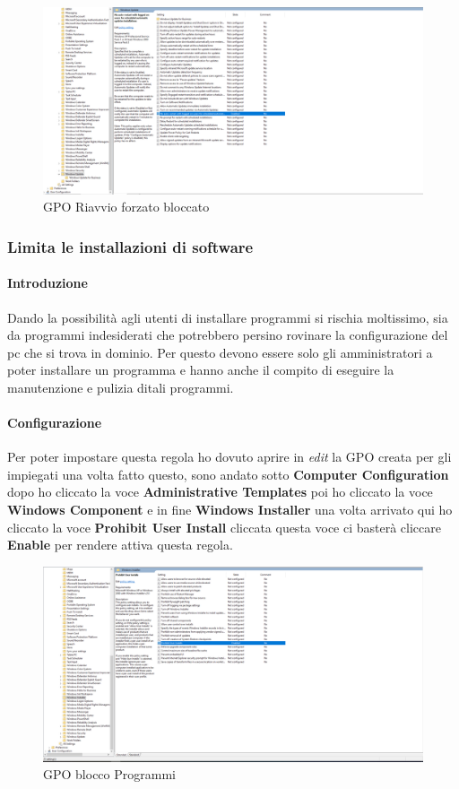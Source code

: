 \documentclass[../main.tex]{subfiles}
\begin{document}
\begin{figure}[h]
    \centering
    \includegraphics[width=1\textwidth]{Images/bloccoRiavvio.png}
    \caption{GPO Riavvio forzato bloccato}
\end{figure}


\pagebreak{}
\thispagestyle{header-pages}
\subsubsection{Limita le installazioni di software}
\paragraph{Introduzione}
Dando la possibilità agli utenti di installare programmi si rischia moltissimo, sia da programmi indesiderati che potrebbero persino rovinare la configurazione del pc che si trova in dominio. Per questo devono essere solo gli amministratori a poter installare un programma e hanno anche il compito di eseguire la manutenzione e pulizia ditali programmi.

\paragraph{Configurazione}
Per poter impostare questa regola ho dovuto aprire in \textit{edit} la GPO creata per gli impiegati una volta fatto questo, sono andato sotto \textbf{Computer Configuration} dopo ho cliccato la voce \textbf{Administrative Templates} poi ho cliccato la voce \textbf{Windows Component} e in fine \textbf{Windows Installer} una volta arrivato qui ho cliccato la voce \textbf{Prohibit User Install} cliccata questa voce ci basterà cliccare \textbf{Enable} per rendere attiva questa regola.

\begin{figure}[h]
    \centering
    \includegraphics[width=1\textwidth]{Images/BloccoProgrammi.png}
    \caption{GPO blocco Programmi}
\end{figure}
\end{document}
